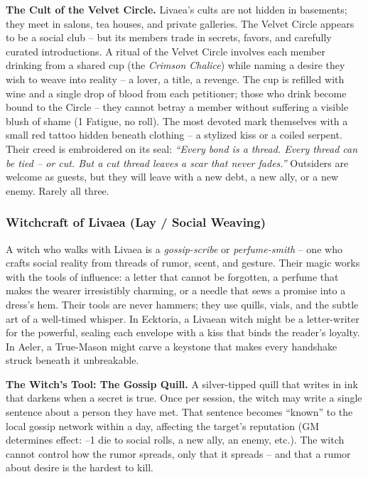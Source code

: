\textbf{The Cult of the Velvet Circle.} Livaea's cults are not hidden in basements; they meet in salons, tea houses, and private galleries. The Velvet Circle appears to be a social club -- but its members trade in secrets, favors, and carefully curated introductions. A ritual of the Velvet Circle involves each member drinking from a shared cup (the \textit{Crimson Chalice}) while naming a desire they wish to weave into reality -- a lover, a title, a revenge. The cup is refilled with wine and a single drop of blood from each petitioner; those who drink become bound to the Circle -- they cannot betray a member without suffering a visible blush of shame (1 Fatigue, no roll). The most devoted mark themselves with a small red tattoo hidden beneath clothing -- a stylized kiss or a coiled serpent. Their creed is embroidered on its seal: \textit{``Every bond is a thread. Every thread can be tied -- or cut. But a cut thread leaves a scar that never fades.''} Outsiders are welcome as guests, but they will leave with a new debt, a new ally, or a new enemy. Rarely all three.

\subsubsection*{Witchcraft of Livaea (Lay / Social Weaving)}

A witch who walks with Livaea is a \textit{gossip-scribe} or \textit{perfume-smith} -- one who crafts social reality from threads of rumor, scent, and gesture. Their magic works with the tools of influence: a letter that cannot be forgotten, a perfume that makes the wearer irresistibly charming, or a needle that sews a promise into a dress's hem. Their tools are never hammers; they use quills, vials, and the subtle art of a well-timed whisper. In Ecktoria, a Livaean witch might be a letter-writer for the powerful, sealing each envelope with a kiss that binds the reader's loyalty. In Aeler, a True-Mason might carve a keystone that makes every handshake struck beneath it unbreakable.

\textbf{The Witch's Tool: The Gossip Quill.} A silver-tipped quill that writes in ink that darkens when a secret is true. Once per session, the witch may write a single sentence about a person they have met. That sentence becomes ``known'' to the local gossip network within a day, affecting the target's reputation (GM determines effect: --1 die to social rolls, a new ally, an enemy, etc.). The witch cannot control how the rumor spreads, only that it spreads -- and that a rumor about desire is the hardest to kill.

